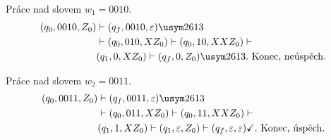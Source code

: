 Práce nad slovem $w_1 = 0010$.
\begin{align*}
    (q_0, 0010, Z_0) &\vdash (q_f, 0010, \varepsilon) \xmark \\
    &\vdash (q_0, 010, XZ_0) \vdash (q_0, 10, XXZ_0) \vdash \\ 
    &(q_1, 0, XZ_0) \vdash (q_f, 0, Z_0) \xmark. \text{ Konec, neúspěch.} 
\end{align*}

Práce nad slovem $w_2 = 0011$.
\begin{align*}
    (q_0, 0011, Z_0) &\vdash (q_f, 0011, \varepsilon) \xmark \\
    &\vdash (q_0, 011, XZ_0) \vdash (q_0, 11, XXZ_0) \vdash \\ 
    &(q_1, 1, XZ_0) \vdash (q_1, \varepsilon, Z_0) \vdash
    (q_f, \varepsilon, \varepsilon) \checkmark. \text{ Konec, úspěch.}
\end{align*}
